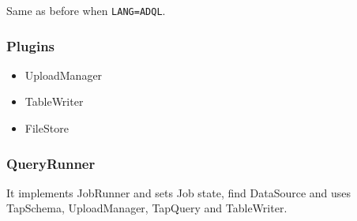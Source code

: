 Same as before when \texttt{LANG=ADQL}.

\subsubsection{Plugins}

\begin{itemize}
\item UploadManager
\item TableWriter
\item FileStore
\end{itemize}


\subsubsection{QueryRunner}

It implements JobRunner and sets Job state, find DataSource and uses TapSchema, UploadManager, TapQuery and TableWriter.








